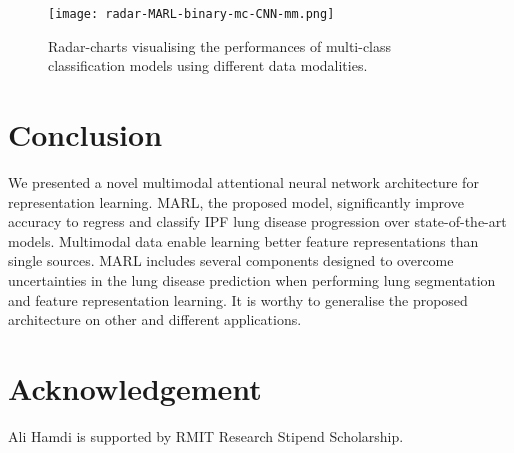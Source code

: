 \documentclass[conference]{IEEEtran}
\begin{document}
\begin{figure*}
    \centering
\texttt{[image: radar-MARL-binary-mc-CNN-mm.png]}
    \caption{
Radar-charts visualising the performances of multi-class classification models using different data modalities.}
    \label{radar-MARL-binary-mc-CNN-mm}
\end{figure*}


\section{Conclusion}\label{con}
We presented a novel multimodal attentional neural network architecture for representation learning. MARL, the proposed model, significantly improve accuracy to regress and classify IPF lung disease progression over state-of-the-art models. Multimodal data enable learning better feature representations than single sources. MARL includes several components designed to overcome uncertainties in the lung disease prediction when performing lung segmentation and feature representation learning. It is worthy to generalise the proposed architecture on other and different applications.

\section*{Acknowledgement}
Ali Hamdi is supported by RMIT Research Stipend Scholarship. %



\end{document}
